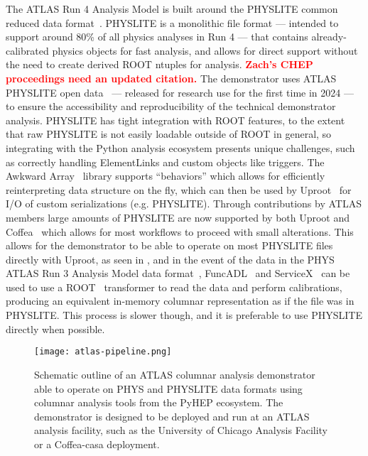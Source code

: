 The ATLAS Run 4 Analysis Model is built around the PHYSLITE common reduced data format~\cite{Schaarschmidt:2024vzr}.
PHYSLITE is a monolithic file format --- intended to support around 80\% of all physics analyses in Run 4 --- that contains already-calibrated physics objects for fast analysis, and allows for direct support without the need to create derived ROOT ntuples for analysis.
\textbf{\textcolor{red}{Zach's CHEP proceedings need an updated citation.}}
The demonstrator uses ATLAS PHYSLITE open data~\cite{ATL-OREACH-PROC-2024-005,Marshall:2919097} --- released for research use for the first time in 2024 --- to ensure the accessibility and reproducibility of the technical demonstrator analysis.
PHYSLITE has tight integration with ROOT features, to the extent that raw PHYSLITE is not easily loadable outside of ROOT in general, so integrating with the Python analysis ecosystem presents unique challenges, such as correctly handling ElementLinks and custom objects like triggers.
The Awkward Array~\cite{Awkward_Array_2018} library supports ``behaviors'' which allows for efficiently reinterpreting data structure on the fly, which can then be used by Uproot~\cite{Uproot_2017} for I/O of custom serializations (e.g. PHYSLITE).
Through contributions by ATLAS members large amounts of PHYSLITE are now supported by both Uproot and Coffea~\cite{Coffea_2023,CMS:2020kpn} which allows for most workflows to proceed with small alterations.
This allows for the demonstrator to be able to operate on most PHYSLITE files directly with Uproot, as seen in , and in the event of the data in the PHYS ATLAS Run 3 Analysis Model data format~\cite{Schaarschmidt:2024vzr}, FuncADL~\cite{funcadl_2024,Proffitt:2021wfh} and ServiceX~\cite{serviceX_2024,serviceX_client_2024,Galewsky:2020xig} can be used to use a ROOT~\cite{Brun:1997pa} transformer to read the data and perform calibrations, producing an equivalent in-memory columnar representation as if the file was in PHYSLITE.
This process is slower though, and it is preferable to use PHYSLITE directly when possible.

\begin{figure}
    \centering
    \texttt{[image: atlas-pipeline.png]}
    \caption{Schematic outline of an ATLAS columnar analysis demonstrator able to operate on PHYS and PHYSLITE data formats using columnar analysis tools from the PyHEP ecosystem.
    The demonstrator is designed to be deployed and run at an ATLAS analysis facility, such as the University of Chicago Analysis Facility or a Coffea-casa deployment.}
    \label{fig:atlas-pipeline}
\end{figure}
